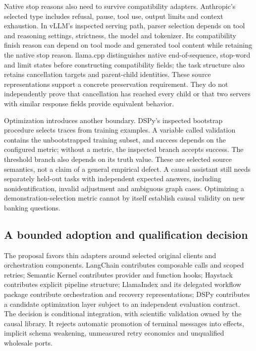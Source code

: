 Native stop reasons also need to survive compatibility adapters. Anthropic's selected type includes
refusal, pause, tool use, output limits and context exhaustion. In vLLM's inspected serving path,
parser selection depends on tool and reasoning settings, strictness, the model and tokenizer.
Its compatibility finish reason can depend on tool mode and generated tool content while retaining
the native stop reason. llama.cpp distinguishes native end-of-sequence, stop-word and limit states
before constructing compatibility fields; the task structure also retains cancellation targets and
parent-child identities. These source representations support a concrete preservation requirement.
They do not independently prove that cancellation has reached every child or that two servers with
similar response fields provide equivalent behavior.~\citep{exec28_dl_anthropic,exec28_dl_vllm,exec28_dl_llamacpp}

Optimization introduces another boundary. DSPy's inspected bootstrap procedure selects traces from
training examples. A variable called validation contains the unbootstrapped training subset, and
success depends on the configured metric; without a metric, the inspected branch accepts success.
The threshold branch also depends on its truth value. These are selected source semantics, not a
claim of a general empirical defect. A causal assistant still needs separately held-out tasks with
independent expected answers, including nonidentification, invalid adjustment and ambiguous graph
cases. Optimizing a demonstration-selection metric cannot by itself establish causal validity on
new banking questions.~\citep{exec28_dl_dspy}

\subsection{A bounded adoption and qualification decision}
The proposal favors thin adapters around selected original clients and orchestration components.
LangChain contributes composable calls and scoped retries; Semantic Kernel contributes provider and
function hooks; Haystack contributes explicit pipeline structure; LlamaIndex and its delegated
workflow package contribute orchestration and recovery representations; DSPy contributes a candidate
optimization layer subject to an independent evaluation contract. The decision is conditional
integration, with scientific validation owned by the causal library. It rejects automatic promotion
of terminal messages into effects, implicit schema weakening, unmeasured retry economics and
unqualified wholesale ports.~\citep{exec28_dl_langchain,exec28_dl_semantic_kernel,exec28_dl_haystack,exec28_dl_llama_index,exec28_dl_workflows,exec28_dl_dspy}

